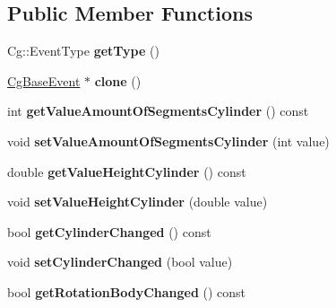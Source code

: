 \subsection*{Public Member Functions}
\begin{DoxyCompactItemize}
\item 
\mbox{\label{class_cg_value_changed_event_abc1121ee543f745c6bf5b55bff3b32b2}} 
Cg\+::\+Event\+Type {\bfseries get\+Type} ()
\item 
\mbox{\label{class_cg_value_changed_event_acc1fbf04dd83ccb6a132bd4a8bc94b84}} 
\hyperlink{class_cg_base_event}{Cg\+Base\+Event} $\ast$ {\bfseries clone} ()
\item 
\mbox{\label{class_cg_value_changed_event_abcd15e4681dba558963d36d26beae935}} 
int {\bfseries get\+Value\+Amount\+Of\+Segments\+Cylinder} () const
\item 
\mbox{\label{class_cg_value_changed_event_a5e584bbbe8088628305b9273ced08c7b}} 
void {\bfseries set\+Value\+Amount\+Of\+Segments\+Cylinder} (int value)
\item 
\mbox{\label{class_cg_value_changed_event_a2f865898b61581363c03fcc592b1d84c}} 
double {\bfseries get\+Value\+Height\+Cylinder} () const
\item 
\mbox{\label{class_cg_value_changed_event_a1aa27220922767e52df5c16cd6421651}} 
void {\bfseries set\+Value\+Height\+Cylinder} (double value)
\item 
\mbox{\label{class_cg_value_changed_event_aa14d08aefeece31b5b4082c21fe68440}} 
bool {\bfseries get\+Cylinder\+Changed} () const
\item 
\mbox{\label{class_cg_value_changed_event_a6293dd20c3970db8568521c5d13b4673}} 
void {\bfseries set\+Cylinder\+Changed} (bool value)
\item 
\mbox{\label{class_cg_value_changed_event_a9893153cabf1cf894649e3b0364379c5}} 
bool {\bfseries get\+Rotation\+Body\+Changed} () const

\end{DoxyCompactItemize}
